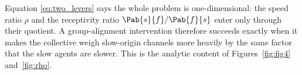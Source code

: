 \begin{remark}
Equation \eqref{eq:two_levers} says the whole problem is one-dimensional: the speed ratio $\rho$ and the receptivity ratio $\Pab{s}{f}/\Pab{f}{s}$ enter only through their quotient. A group-alignment intervention therefore succeeds exactly when it makes the collective weigh slow-origin channels more heavily by the same factor that the slow agents are slower. This is the analytic content of Figures~\ref{fig:fig4} and~\ref{fig:rho}.
\end{remark}
